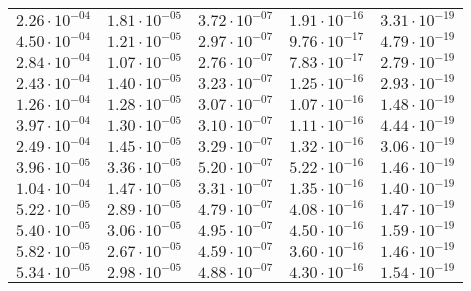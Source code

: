 \begin{table}
\begin{tabular}{lllll}
$\mathrm{2.26 \cdot 10^{-04}}$ & $\mathrm{1.81 \cdot 10^{-05}}$ & $\mathrm{3.72 \cdot 10^{-07}}$ & $\mathrm{1.91 \cdot 10^{-16}}$ & $\mathrm{3.31 \cdot 10^{-19}}$ \\
$\mathrm{4.50 \cdot 10^{-04}}$ & $\mathrm{1.21 \cdot 10^{-05}}$ & $\mathrm{2.97 \cdot 10^{-07}}$ & $\mathrm{9.76 \cdot 10^{-17}}$ & $\mathrm{4.79 \cdot 10^{-19}}$ \\
$\mathrm{2.84 \cdot 10^{-04}}$ & $\mathrm{1.07 \cdot 10^{-05}}$ & $\mathrm{2.76 \cdot 10^{-07}}$ & $\mathrm{7.83 \cdot 10^{-17}}$ & $\mathrm{2.79 \cdot 10^{-19}}$ \\
$\mathrm{2.43 \cdot 10^{-04}}$ & $\mathrm{1.40 \cdot 10^{-05}}$ & $\mathrm{3.23 \cdot 10^{-07}}$ & $\mathrm{1.25 \cdot 10^{-16}}$ & $\mathrm{2.93 \cdot 10^{-19}}$ \\
$\mathrm{1.26 \cdot 10^{-04}}$ & $\mathrm{1.28 \cdot 10^{-05}}$ & $\mathrm{3.07 \cdot 10^{-07}}$ & $\mathrm{1.07 \cdot 10^{-16}}$ & $\mathrm{1.48 \cdot 10^{-19}}$ \\
$\mathrm{3.97 \cdot 10^{-04}}$ & $\mathrm{1.30 \cdot 10^{-05}}$ & $\mathrm{3.10 \cdot 10^{-07}}$ & $\mathrm{1.11 \cdot 10^{-16}}$ & $\mathrm{4.44 \cdot 10^{-19}}$ \\
$\mathrm{2.49 \cdot 10^{-04}}$ & $\mathrm{1.45 \cdot 10^{-05}}$ & $\mathrm{3.29 \cdot 10^{-07}}$ & $\mathrm{1.32 \cdot 10^{-16}}$ & $\mathrm{3.06 \cdot 10^{-19}}$ \\
$\mathrm{3.96 \cdot 10^{-05}}$ & $\mathrm{3.36 \cdot 10^{-05}}$ & $\mathrm{5.20 \cdot 10^{-07}}$ & $\mathrm{5.22 \cdot 10^{-16}}$ & $\mathrm{1.46 \cdot 10^{-19}}$ \\
$\mathrm{1.04 \cdot 10^{-04}}$ & $\mathrm{1.47 \cdot 10^{-05}}$ & $\mathrm{3.31 \cdot 10^{-07}}$ & $\mathrm{1.35 \cdot 10^{-16}}$ & $\mathrm{1.40 \cdot 10^{-19}}$ \\
$\mathrm{5.22 \cdot 10^{-05}}$ & $\mathrm{2.89 \cdot 10^{-05}}$ & $\mathrm{4.79 \cdot 10^{-07}}$ & $\mathrm{4.08 \cdot 10^{-16}}$ & $\mathrm{1.47 \cdot 10^{-19}}$ \\
$\mathrm{5.40 \cdot 10^{-05}}$ & $\mathrm{3.06 \cdot 10^{-05}}$ & $\mathrm{4.95 \cdot 10^{-07}}$ & $\mathrm{4.50 \cdot 10^{-16}}$ & $\mathrm{1.59 \cdot 10^{-19}}$ \\
$\mathrm{5.82 \cdot 10^{-05}}$ & $\mathrm{2.67 \cdot 10^{-05}}$ & $\mathrm{4.59 \cdot 10^{-07}}$ & $\mathrm{3.60 \cdot 10^{-16}}$ & $\mathrm{1.46 \cdot 10^{-19}}$ \\
$\mathrm{5.34 \cdot 10^{-05}}$ & $\mathrm{2.98 \cdot 10^{-05}}$ & $\mathrm{4.88 \cdot 10^{-07}}$ & $\mathrm{4.30 \cdot 10^{-16}}$ & $\mathrm{1.54 \cdot 10^{-19}}$ \\

\end{tabular}
\end{table}
